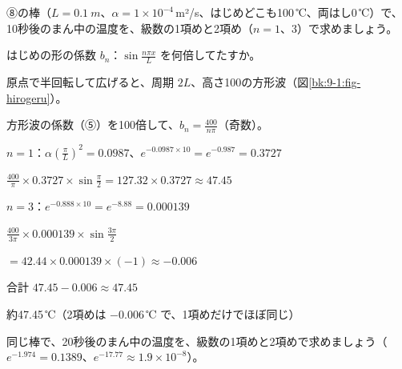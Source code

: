 \begin{reidai}[棒のまん中の温度]
⑧の棒（$L=\qty{0.1}{m}$、$\alpha=1\times10^{-4}$\,m²/s、はじめどこも100\,℃、両はし0\,℃）で、10秒後のまん中の温度を、級数の1項めと2項め（$n=1$、$3$）で求めましょう。\par
\kangaekata {}\par
{}\enspace はじめの形の係数 $b_n$：$\sin\frac{n\pi x}{L}$ を何倍してたすか。\par
{}\enspace 原点で半回転して広げると、周期 $2L$、高さ100の方形波（図\ref{bk:9-1:fig-hirogeru}）。\par
{}\enspace 方形波の係数（⑤）を100倍して、$b_n=\frac{400}{n\pi}$（奇数）。\par
\shiki\kixbs $n=1$：$\alpha(\frac{\pi}{L})^2=0.0987$、$e^{-0.0987\times10}=e^{-0.987}=0.3727$\par
\kixbb $\frac{400}{\pi}\times0.3727\times\sin\frac{\pi}{2}=127.32\times0.3727\approx47.45$\par
\kixba $n=3$：$e^{-0.888\times10}=e^{-8.88}=0.000139$\par
\kixbb $\frac{400}{3\pi}\times0.000139\times\sin\frac{3\pi}{2}$\par
\kixbb $=42.44\times0.000139\times(-1)\approx-0.006$\par
\kixba 合計 $47.45-0.006\approx47.45$\par
\kotae 約47.45\,℃（2項めは $-0.006$\,℃ で、1項めだけでほぼ同じ）
\end{reidai}

\begin{jibun}
同じ棒で、20秒後のまん中の温度を、級数の1項めと2項めで求めましょう（$e^{-1.974}=0.1389$、$e^{-17.77}\approx1.9\times10^{-8}$）。
\end{jibun}

